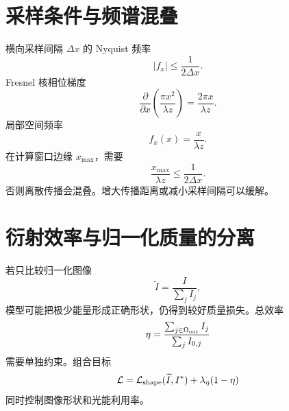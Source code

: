 \documentclass[UTF8,12pt,a4paper,fontset=none]{ctexart}
\numberwithin{equation}{section}
\newcommand{\Loss}{\mathcal{L}}
\begin{document}
\section{采样条件与频谱混叠}
横向采样间隔 $\Delta x$ 的 Nyquist 频率
\begin{equation}
 |f_x|\le\frac1{2\Delta x}.
\end{equation}
Fresnel 核相位梯度
\begin{equation}
 \frac{\partial}{\partial x}
 \left(\frac{\pi x^2}{\lambda z}\right)
 =\frac{2\pi x}{\lambda z}.
\end{equation}
局部空间频率
\begin{equation}
 f_x(x)=\frac{x}{\lambda z}.
\end{equation}
在计算窗口边缘 $x_{\max}$，需要
\begin{equation}
 \frac{x_{\max}}{\lambda z}
 \le\frac1{2\Delta x}.
\end{equation}
否则离散传播会混叠。增大传播距离或减小采样间隔可以缓解。

\section{衍射效率与归一化质量的分离}
若只比较归一化图像
\begin{equation}
 \widetilde I=\frac{I}{\sum_jI_j},
\end{equation}
模型可能把极少能量形成正确形状，仍得到较好质量损失。总效率
\begin{equation}
 \eta=\frac{\sum_{j\in\Omega_{\rm out}}I_j}
 {\sum_jI_{0,j}}
\end{equation}
需要单独约束。组合目标
\begin{equation}
 \Loss=\Loss_{\rm shape}(\widetilde I,I^*)
 +\lambda_\eta(1-\eta)
\end{equation}
同时控制图像形状和光能利用率。
\end{document}
